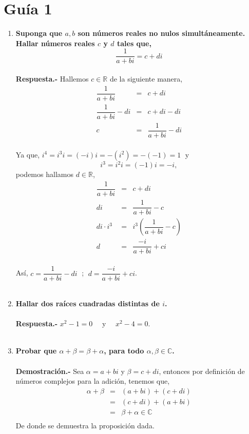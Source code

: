 
\section*{\center Guía 1}
\vspace{1.5cm}
\setlength{\columnsep}{1cm}
\setlength{\columnseprule}{0.1pt}
\begin{multicols}{2}

\begin{enumerate}[\bfseries 1.]

    \item  \textbf{\boldmath Suponga que $a,b$ son números reales no nulos simultáneamente. Hallar números reales $c$ y $d$ tales que,
	$$\dfrac{1}{a+bi}=c+di$$\\}
	\textbf{Respuesta.-}\; Hallemos $c\in \mathbb{R}$ de la siguiente manera,
	$$\begin{array}{rcl}
	    \dfrac{1}{a+bi}&=&c+di\\
	    \dfrac{1}{a+bi} - di&=&c+di - di\\
	    c&=&\dfrac{1}{a+bi}-di\\
	\end{array}$$

	Ya que, $i^4 = i^3i=(-i)i=-(i^2) = -(-1) = 1\; $
	y $$i^3 = i^2i=(-1)i = -i,$$
	podemos hallamos $d\in \mathbb{R}$,
	$$\begin{array}{rcl}
	    \dfrac{1}{a+bi}&=&c+di\\
			   di&=&\dfrac{1}{a+bi}-c\\
			   di\cdot i^3&=&i^3\left(\dfrac{1}{a+bi}-c\right)\\
			   d&=&\dfrac{-i}{a+bi}+ci\\
	\end{array}$$

	Así, $c=\dfrac{1}{a+bi}-di\;$ ; $\; d=\dfrac{-i}{a+bi}+ci$.\\\\

    \item \textbf{\boldmath Hallar dos raíces cuadradas distintas de $i$.}\\\\
	\textbf{Respuesta.-}\; $x^2-1 = 0\quad $ y $\quad x^2-4=0$.\\\\  

    \item \textbf{\boldmath Probar que $\alpha+\beta = \beta +\alpha$, para todo $\alpha,\beta \in \mathbb{C}$.}\\\\
	\textbf{Demostración.-}\; Sea $\alpha = a+bi$ y $\beta = c+di$, entonces por definición de números complejos para la adición, tenemos que,
	$$\begin{array}{rcl}
	    \alpha + \beta &=&(a+bi)+(c+di)\\
			   &=&(c+di)+(a+bi)\\
			   &=&\beta + \alpha\in \mathbb{C}\\
	\end{array}$$
	De donde se demuestra la proposición dada.\\\\


\end{enumerate}
\end{multicols}
